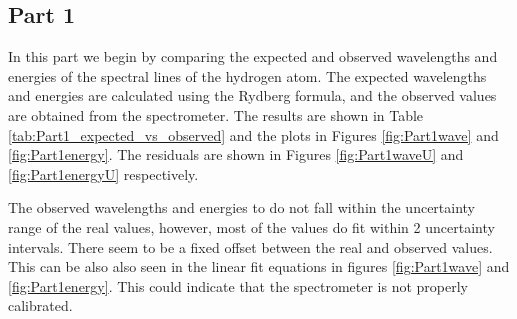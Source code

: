 
\subsection{Part 1}

In this part we begin by comparing the expected and observed wavelengths and energies of the spectral lines of the hydrogen atom. The expected wavelengths and energies are calculated using the Rydberg formula, and the observed values are obtained from the spectrometer. The results are shown in Table \ref{tab:Part1_expected_vs_observed} and the plots in Figures \ref{fig:Part1wave} and \ref{fig:Part1energy}.
The residuals are shown in Figures \ref{fig:Part1waveU} and \ref{fig:Part1energyU} respectively.

The observed wavelengths and energies to do not fall within the uncertainty range of the real values, however, most of the values do fit within 2 uncertainty intervals. There seem to be a fixed offset between the real and observed values. This can be also also seen in the linear fit equations in figures \ref{fig:Part1wave} and \ref{fig:Part1energy}.
This could indicate that the spectrometer is not properly calibrated.

